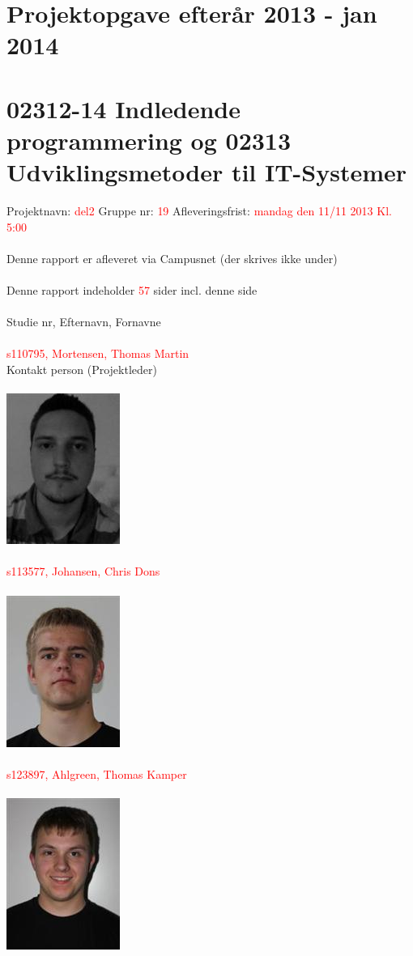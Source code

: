 \documentclass{article}
\begin{document}
\section*{Projektopgave efterår 2013 - jan 2014}
\section*{02312-14 Indledende programmering og 02313 Udviklingsmetoder til IT-Systemer}
Projektnavn: \textcolor{red}{del2}
Gruppe nr: \textcolor{red}{19}
Afleveringsfrist: \textcolor{red}{mandag den 11/11 2013 Kl. 5:00}
\\\\
Denne rapport er afleveret via Campusnet (der skrives ikke under)
\\\\
Denne rapport indeholder \textcolor{red}{57} sider incl. denne side
\\\\
Studie nr, Efternavn, Fornavne
\\\\
\textcolor{red}{s110795, Mortensen, Thomas Martin}
\\
Kontakt person (Projektleder)
\\\\
\includegraphics[scale=0.5]{ThomasM.jpg}
\\\\
\textcolor{red}{s113577, Johansen, Chris Dons}
\\\\
\includegraphics[scale=0.5]{ChrisJ.jpg}
\\\\
\textcolor{red}{s123897, Ahlgreen, Thomas Kamper}
\\\\
\includegraphics[scale=0.5]{ThomasA.jpg}
\newpage
\end{document}
